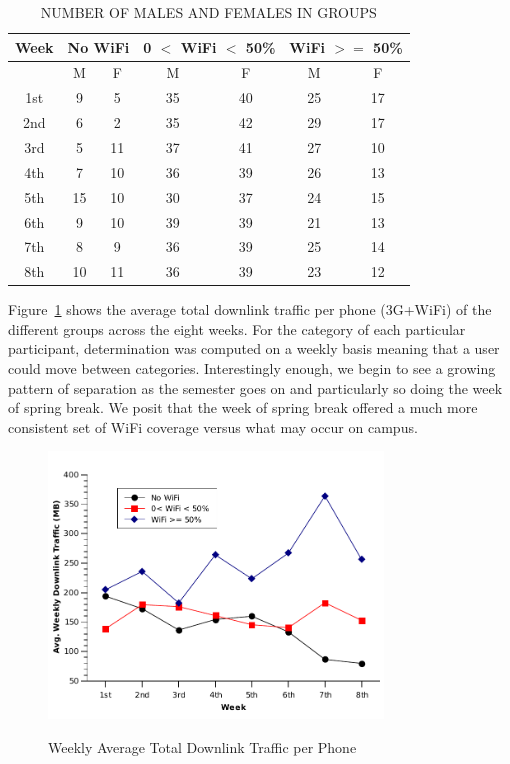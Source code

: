 \begin{table}[h!tbp] 
\caption{NUMBER OF MALES AND FEMALES IN GROUPS} 
\label{table:gender}
\centering 
\begin{tabular}{|c|cc|cc|cc|}
\hline
Week &  \multicolumn{2}{c}{No WiFi} & \multicolumn{2}{|c|}{0 $<$ WiFi $<$ 50\%} & \multicolumn{2}{c|}{WiFi $>=$ 50\%} \\
\hline
& M & F & M & F &   M & F \\
\hline
 \parbox[t]{3cm}{\hspace{12mm}1st}& 9&5&35&40&25&17\\ 
\hline
2nd &6&2	&35&42&29&17\\
\hline
3rd&5&11&37&41&27&10\\
\hline
4th&7&10&36&39&26&13\\
\hline
5th&15&10&30&37&24&15\\
\hline
6th&9&10&39&39&21&13\\
\hline
7th&8&9&36&39&25	&14\\
\hline
8th&10&11&36&39&23&12\\
\hline
\end{tabular}
\end{table}

Figure~\ref{fig:downlink} shows the average total downlink traffic per phone (3G+WiFi) of the different groups across the eight weeks. For the category of each particular participant, determination was computed on a weekly basis meaning that a user could move between categories. Interestingly enough, we begin to see a growing pattern of separation as the semester goes on and particularly so doing the week of spring 
break. We posit that the week of spring break offered a much more consistent set of WiFi coverage versus what may occur on campus.   

\begin{figure}[h!tbp]
\centering
{\includegraphics[width = 3.5in]{graphs/downlink.pdf}}
\caption{Weekly Average Total Downlink Traffic per Phone} 
\label{fig:downlink}
\end{figure}

